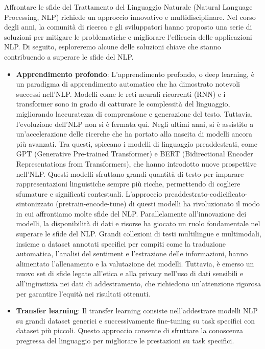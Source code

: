 Affrontare le sfide del Trattamento del Linguaggio Naturale (Natural Language Processing, NLP) richiede un approccio innovativo e multidisciplinare. Nel corso degli anni, la comunità di ricerca e gli sviluppatori hanno proposto una serie di soluzioni per mitigare le problematiche e migliorare l'efficacia delle applicazioni NLP. Di seguito, esploreremo alcune delle soluzioni chiave che stanno contribuendo a superare le sfide del NLP.
\begin{itemize}
    \item \textbf{Apprendimento profondo}: L'apprendimento profondo, o deep learning, è un paradigma di apprendimento automatico che ha dimostrato notevoli successi nell'NLP. Modelli come le reti neurali ricorrenti (RNN) e i transformer sono in grado di catturare le complessità del linguaggio, migliorando laccuratezza di comprensione e generazione del testo. Tuttavia, l'evoluzione dell'NLP non si è fermata qui. Negli ultimi anni, si è assistito a un'accelerazione delle ricerche che ha portato alla nascita di modelli ancora più avanzati. Tra questi, spiccano i modelli di linguaggio preaddestrati, come GPT (Generative Pre-trained Transformer) e BERT (Bidirectional Encoder Representations from Transformers), che hanno introdotto nuove prospettive nell'NLP. Questi modelli sfruttano grandi quantità di testo per imparare rappresentazioni linguistiche sempre più ricche, permettendo di cogliere sfumature e significati contestuali. L'approccio preaddestrato-codicificato-sintonizzato (pretrain-encode-tune) di questi modelli ha rivoluzionato il modo in cui affrontiamo molte sfide del NLP. Parallelamente all'innovazione dei modelli, la disponibilità di dati e risorse ha giocato un ruolo fondamentale nel superare le sfide del NLP. Grandi collezioni di testi multilingue e multimodali, insieme a dataset annotati specifici per compiti come la traduzione automatica, l'analisi del sentiment e l'estrazione delle informazioni, hanno alimentato l'allenamento e la valutazione dei modelli. Tuttavia, è emerso un nuovo set di sfide legate all'etica e alla privacy nell'uso di dati sensibili e all'ingiustizia nei dati di addestramento, che richiedono un'attenzione rigorosa per garantire l'equità nei risultati ottenuti.
    
    \item \textbf{Transfer learning}: Il transfer learning consiste nell'addestrare modelli NLP su grandi dataset generici e successivamente fine-tuning su task specifici con dataset più piccoli. Questo approccio consente di sfruttare la conoscenza pregressa del linguaggio per migliorare le prestazioni su task specifici.


\end{itemize}
